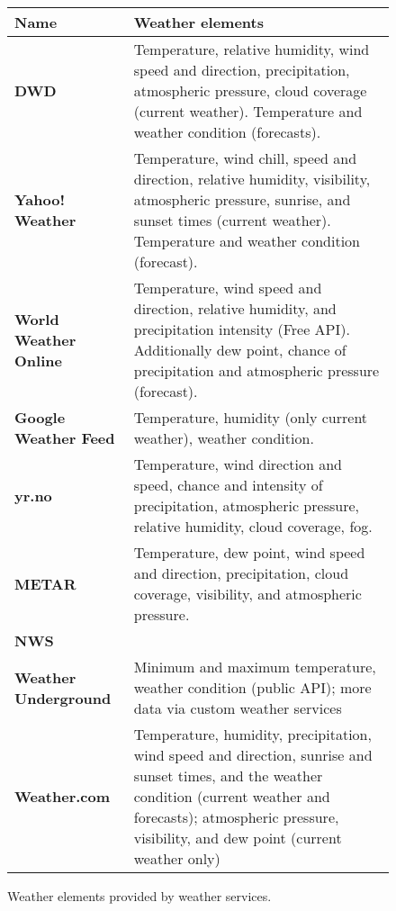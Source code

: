 \begin{figure}
\begin{longtable}{|p{}|p{}|}
  \hline
  \textbf{Name} & \textbf{Weather elements} \\
  \hline\hline
  \textbf{DWD} & Temperature, relative humidity, wind speed and direction, precipitation, atmospheric pressure, cloud coverage (current weather). Temperature and weather condition (forecasts).\\
  \hline
  \textbf{Yahoo! Weather} & Temperature, wind chill, speed and direction, relative humidity, visibility, atmospheric pressure, sunrise, and sunset times (current weather). Temperature and weather condition (forecast).\\
  \hline
  \textbf{World Weather Online} & Temperature, wind speed and direction, relative humidity, and precipitation intensity (Free API). Additionally dew point, chance of precipitation and atmospheric pressure (forecast).\\
  \hline
  \textbf{Google Weather Feed} & Temperature, humidity (only current weather), weather condition.\\
  \hline
  \textbf{yr.no} & Temperature, wind direction and speed, chance and intensity of precipitation, atmospheric pressure, relative humidity, cloud coverage, fog.\\
  \hline
  \textbf{METAR} & Temperature, dew point, wind speed and direction, precipitation, cloud coverage, visibility, and atmospheric pressure. \\
  \hline
  \textbf{NWS} & \\ %
  \hline
  \textbf{Weather Underground} & Minimum and maximum temperature, weather condition (public API); more data via custom weather services \\
  \hline
  \textbf{Weather.com} & Temperature, humidity, precipitation, wind speed and direction, sunrise and sunset times, and the weather condition (current weather and forecasts); atmospheric pressure, visibility, and dew point (current weather only) \\
  \hline
\end{longtable}
\vspace{.5em}
\caption{Weather elements provided by weather services.}
\label{table:weather_data6}
\end{figure}

